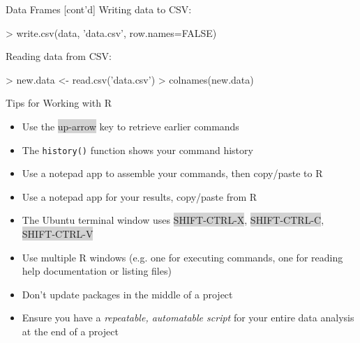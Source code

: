 \documentclass[ignorenonframetext,xcolor=x11names]{beamer}
\begin{document}
\begin{frame}[fragile]{Data Frames \small [cont'd]}
Writing data to CSV:
\begin{Rcode}
> write.csv(data, 'data.csv', row.names=FALSE)
\end{Rcode}

Reading data from CSV:
\begin{Rcode}
> new.data <- read.csv('data.csv')
> colnames(new.data)
\end{Rcode}
\end{frame}

\begin{frame}{Tips for Working with R}
\begin{itemize}
    \item Use the \colorbox{lightgray}{up-arrow} key to retrieve earlier commands
    \item The \texttt{history()} function shows your command history
    \item Use a notepad app to assemble your commands, then copy/paste to R
    \item Use a notepad app for your results, copy/paste from R
    \item The Ubuntu terminal window uses \colorbox{lightgray}{SHIFT-CTRL-X}, \colorbox{lightgray}{SHIFT-CTRL-C}, \colorbox{lightgray}{SHIFT-CTRL-V}
    \item Use multiple R windows (e.g. one for executing commands, one for reading help documentation or listing files)
    \item Don't update packages in the middle of a project
    \item Ensure you have a \emph{repeatable, automatable script} for your entire data analysis at the end of a project
\end{itemize}
\end{frame}
\end{document}
